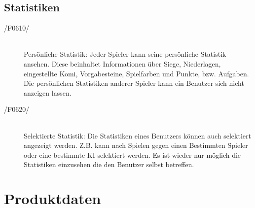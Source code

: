 \section{Statistiken}

\begin{description}
	\item[/F0610/]~\\
		Persönliche Statistik: Jeder Spieler kann seine persönliche Statistik ansehen. Diese beinhaltet Informationen über Siege, Niederlagen, eingestellte Komi, Vorgabesteine, Spielfarben und Punkte, bzw. Aufgaben. Die persönlichen Statistiken anderer Spieler kann ein Benutzer sich nicht anzeigen lassen.
	\item[/F0620/]~\\
		Selektierte Statistik: Die Statistiken eines Benutzers können auch selektiert angezeigt werden. Z.B. kann nach Spielen gegen einen Bestimmten Spieler oder eine bestimmte KI selektiert werden. Es ist wieder nur möglich die Statistiken einzusehen die den Benutzer selbst betreffen.
\end{description}



\chapter{Produktdaten}

